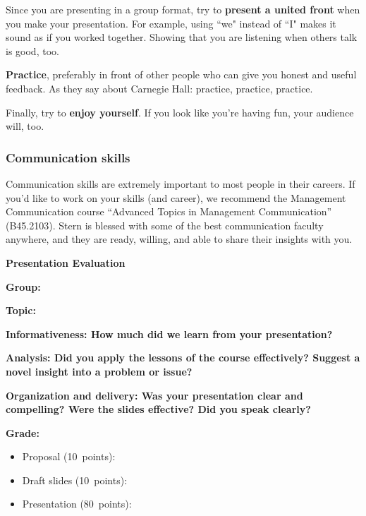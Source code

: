 \documentclass[letterpaper,12pt]{article}
\begin{document}
Since you are presenting in a group format, try to {\bf present a
united front} when you make your presentation.  For example, using
``we" instead of ``I" makes it sound as if you worked together.
Showing that you are listening when others talk is good, too.

{\bf Practice}, preferably in front of other people who can give you honest and useful feedback.
As they say about Carnegie Hall:  practice, practice, practice.

Finally, try to {\bf enjoy yourself}.  If you look like you're
having fun, your audience will, too.


\subsubsection*{Communication skills}

Communication skills are extremely important to most people in their careers.  If you'd like to
work on your skills (and career), 
we recommend the Management Communication course ``Advanced Topics in
Management Communication'' (B45.2103).  Stern is blessed with some of the best communication
faculty anywhere, and they are ready, willing, and able to share their insights with you.

\pagebreak
\thispagestyle{empty}%
\Head
\centerline{\large \bf Presentation Evaluation}%

\bigskip
{\bf Group:}

{\bf Topic:}

{\bf Informativeness:  How much did we learn from your presentation? } 


 
\vspace*{1.25in}
{\bf Analysis:  Did you apply the lessons of the course effectively?  
Suggest a novel insight into a problem or issue?}


\vspace*{1.25in}
{\bf Organization and delivery:  Was your presentation clear and compelling?  
Were the slides effective?  Did you speak clearly?}


\vspace*{1.25in}
{\bf Grade:}
\begin{itemize}
\item Proposal (10~points): 
\item Draft slides (10~points):
\item Presentation (80~points):  
\end{itemize}
\end{document}
